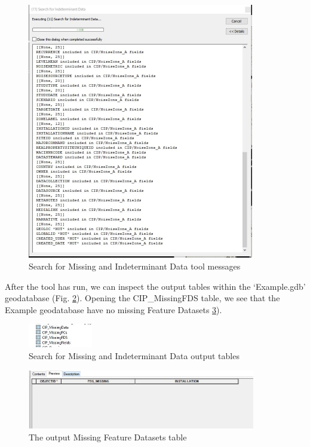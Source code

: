 \documentclass[openany]{book}
\theoremstyle{definition}
\theoremstyle{definition}
\theoremstyle{definition}
\theoremstyle{remark}
\begin{document}
\begin{figure}[H]

{\centering \includegraphics[width=3.9in,]{figures/indtSearch-messages} 

}

\caption{Search for Missing and Indeterminant Data tool messages}\label{fig:indtSearchmessages}
\end{figure}

After the tool has run, we can inspect the output tables within the
`Example.gdb' geodatabase (Fig. \ref{fig:indtSearchtables}). Opening the
CIP\_MissingFDS table, we see that the Example geodatabase have no
missing Feature Datasets \ref{fig:indtSearchmissingFDS}).

\begin{figure}[H]

{\centering \includegraphics[width=1.1in,]{figures/indtSearch-tables} 

}

\caption{Search for Missing and Indeterminant Data output tables}\label{fig:indtSearchtables}
\end{figure}\begin{figure}[H]

{\centering \includegraphics[width=3.92in,]{figures/indtSearch-missingFDS} 

}

\caption{The output Missing Feature Datasets table}\label{fig:indtSearchmissingFDS}
\end{figure}
\end{document}
